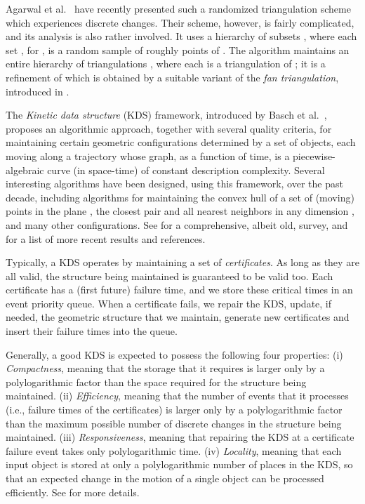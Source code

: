 \documentclass[11pt]{article}
\begin{document}
Agarwal et al.~\cite{AWY} have recently presented such a randomized triangulation scheme which experiences
 discrete changes. Their scheme, however, is fairly 
complicated, and its analysis is also rather involved. It uses a hierarchy of subsets , where each set , for , is a random sample of roughly  points of . 
The algorithm maintains an entire hierarchy of triangulations , where each  is a triangulation of ; it is a refinement of  which is obtained by a suitable variant of the \textit{fan triangulation}, introduced in \cite{ABG}.

\medskip
{} 
The {\em Kinetic data structure\/} (KDS) framework, introduced by
Basch et al.~\cite{BG99}, proposes an algorithmic
approach, together with several quality criteria, for maintaining
certain geometric configurations determined by a set of objects,
each moving along a trajectory whose graph, as a function of time,
is a piecewise-algebraic curve (in space-time) of constant description complexity.
Several interesting algorithms have been designed, using this
framework, over the past decade, including algorithms for
maintaining the convex hull of a set of (moving) points in the
plane \cite{BG99}, the closest pair and all nearest neighbors
in any dimension \cite{AgKS,BG99}, and many other configurations. 
See \cite{Gui} for a comprehensive, albeit old, survey, and \cite{AgKS}
for a list of more recent results and references.

Typically, a KDS operates by maintaining a set of \textit{certificates}. As long as they are all valid, the structure being maintained is guaranteed to be valid too. Each certificate has a (first future) failure time, and we store these critical times in an event priority queue. When a certificate fails, we repair the KDS, update, if needed, the geometric structure that we maintain, generate new certificates and insert their failure times into the queue. 

Generally, a good KDS is expected to possess the following four properties: (i) \textit{Compactness}, meaning that the storage that it requires is larger only by a polylogarithmic factor than the space required for the structure being maintained. (ii) \textit{Efficiency}, meaning that the number of events that it processes (i.e., failure times of the certificates) is larger only by a polylogarithmic factor than the maximum possible number of discrete changes in the structure being maintained. (iii) \textit{Responsiveness}, meaning that repairing the KDS at a certificate failure event takes only  polylogarithmic time. (iv) \textit{Locality}, meaning that each input object is stored at only a polylogarithmic number of places in the KDS, so that an expected change in the motion of a single object can be processed efficiently. See \cite{AKS,BG99} for more details.
\end{document}
